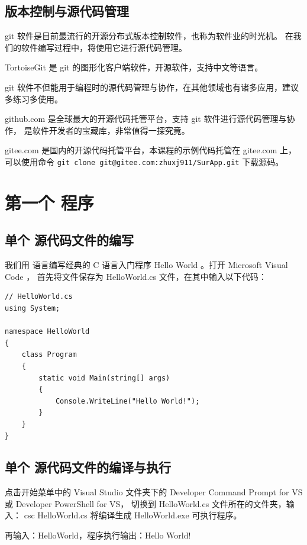 \subsection{版本控制与源代码管理}

git 软件是目前最流行的开源分布式版本控制软件，也称为软件业的时光机。
在我们的软件编写过程中，将使用它进行源代码管理。

TortoiseGit 是 git 的图形化客户端软件，开源软件，支持中文等语言。

git 软件不但能用于编程时的源代码管理与协作，在其他领域也有诸多应用，建议多练习多使用。

github.com 是全球最大的开源代码托管平台，支持 git 软件进行源代码管理与协作，
是软件开发者的宝藏库，非常值得一探究竟。

gitee.com 是国内的开源代码托管平台，本课程的示例代码托管在 gitee.com 上，
可以使用命令 \verb|git clone git@gitee.com:zhuxj911/SurApp.git| 下载源码。

\section{第一个 \cs  程序}

\subsection{单个 \cs  源代码文件的编写}
我们用 \cs 语言编写经典的 C 语言入门程序 Hello World 。打开 Microsoft Visual Code ，
首先将文件保存为 HelloWorld.cs 文件，在其中输入以下代码：

\begin{lstlisting}
// HelloWorld.cs
using System;

namespace HelloWorld
{
	class Program
	{
		static void Main(string[] args) 
		{
			Console.WriteLine("Hello World!");
		}
	}
}
\end{lstlisting}



\subsection{单个 \cs  源代码文件的编译与执行}

点击开始菜单中的 Visual Studio 文件夹下的 Developer Command Prompt for VS 或 Developer PowerShell for VS，
切换到 HelloWorld.cs 文件所在的文件夹，输入： csc HelloWorld.cs 将编译生成 HelloWorld.exe
可执行程序。

再输入：HelloWorld，程序执行输出：Hello World!


